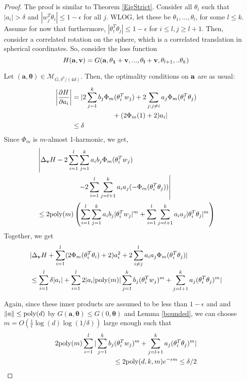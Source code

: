 \begin{proof}
  The proof is similar to Theorem \ref{EigStrict}. Consider all
  $\theta_i$ such that $|a_i| > \delta$ and
  $|w_j^T\theta_i| \leq 1-\epsilon$ for all $j$. WLOG, let these be
  $\theta_1,...,\theta_l$, for some $l \leq k$. Assume for now that
  furthermore, $|\theta_i^T\theta_j| \leq 1-\epsilon$ for
  $i \leq l, j\geq l+1$.  Then, consider a correlated rotation on the
  sphere, which is a correlated translation in spherical
  coordinates. So, consider the loss function 
%
\[ H({\bf a, v}) = G({\bf a,\theta_1+v,...,\theta_l+v},\theta_{l+1},..\theta_k)\]

Let $(\boldsymbol{a,\theta}) \in \mathcal{M}_{G, \delta^2/(4d)}$. Then,
the optimality conditions on ${\bf a}$ are as usual:
%
\begin{align*}
   \left| \frac{\partial H}{\partial a_i} \right| & = \lvert 2\sum_{j=1}^k b_j \Phi_m(\theta_i^T w_j) +
    2\sum_{j: j\neq i} a_j \Phi_m(\theta_i^T\theta_j) \\
& \qquad \qquad \qquad + (2\Phi_m(1) +
    2)a_i \rvert \\
& \leq \delta 
\end{align*}
%
Since $\Phi_m$ is $m$-almost 1-harmonic, we get,
%
\begin{align*}
  &  \left| \Delta_{{\bf v}} H -  2\sum_{i=1}^l\sum_{j=1}^k a_i b_j
    \Phi_m(\theta_i^Tw_j) \right. \\
& \qquad \qquad \qquad \left.- 2\sum_{i=1}^l\sum_{j= l+1}^k
  a_ia_j(-\Phi_m(\theta_i^T\theta_j)) \right| \\
  & \leq   2\mathrm{poly}(m)\left(\sum_{i=1}^l\sum_{j=1}^k a_i b_j  |\theta_i^Tw_j|^m+\sum_{i=1}^l\sum_{j= l+1}^k a_ia_j|\theta_i^T\theta_j|^m\right)
\end{align*}
%
Together, we get
%
\begin{align*}
& |\Delta_{{\bf v}}H + \sum_{i=1}^l (2\Phi_m(\theta_i^T\theta_i)+2)a_i^2 + 2\sum_{i \neq j}^l a_ia_j\Phi_m(\theta_i^T\theta_j)| \\
& \leq \sum_{i=1}^l\delta |a_i| +\sum_{i=1}^l 2|a_i|\mathrm{poly}(m)|\sum_{j=1}^k b_j
  (\theta_i^Tw_j)^m +  \sum_{j=l+1}^k  a_j(\theta_i^T\theta_j)^m|
\\
\end{align*}

Again, since these inner products are assumed to be less than
$1-\epsilon$ and and $\|a\| \leq \mathrm{poly}(d)$ by
$G(\boldsymbol{a,\theta}) \leq G(0,\boldsymbol{\theta})$ and Lemma
\ref{bounded}, we can choose
$m = O(\frac{1}{\epsilon}\log(d)\log(1/\delta))$ large enough such
that
%
\begin{align*}
 2\mathrm{poly}(m)\sum_{i=1}^l|\sum_{j=1}^k b_j (\theta_i^Tw_j)^m +
  \sum_{j=l+1}^k  a_j(\theta_i^T\theta_j)^m| \\
 \leq  2\mathrm{poly}(d,k,m)e^{-\epsilon m} \leq \delta/2
\end{align*}


\end{proof}

